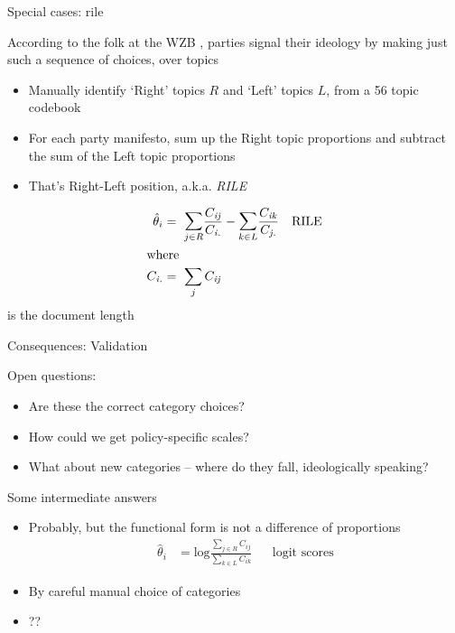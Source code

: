 \documentclass{hertieteaching}
\begin{document}
\begin{frame}{Special cases: rile}

According to the folk at the WZB \parencite{Budge.etal1987,Budge1999}, parties signal their ideology by making just such a sequence of choices, over topics
\begin{itemize}
  \item Manually identify `Right' topics $R$ and `Left' topics $L$, from a 56 topic codebook
  \item For each party manifesto, sum up the Right topic proportions and subtract the sum of the Left topic proportions
  \item That's Right-Left position, a.k.a. \textit{RILE}
\end{itemize}
\begin{align*}
\hat{\theta}_i &=~ \mathlarger{\sum}_{j \in R} \frac{C_\mathit{ij}}{C_\mathit{i.}} -
                 \mathlarger{\sum}_{k \in L} \frac{C_\mathit{ik}}{C_\mathit{j.}}& &\text{RILE}\\
                 \intertext{where}
C_\mathit{i.} &=~ \sum_{j} C_\mathit{ij}                
\end{align*}
is the document length
%
%
%
%

\end{frame}
\begin{frame}{Consequences: Validation}


Open questions:
\begin{itemize}
  \item Are these the correct category choices?
  \item How could we get policy-specific scales? \parencite{Lowe.etal2011,Benoit.etal2012a}
  \item What about new categories -- where do they fall, ideologically speaking?
\end{itemize}

Some intermediate answers \parencite{Lowe.etal2011}
\begin{itemize}
  \item Probably, but the functional form is not a difference of proportions
\begin{align*}
\hat{\theta}_i & = \text{log} \frac{\sum_{j \in R} C_{ij}}
                                   {\sum_{k \in L} C_{ik}} & & \text{logit scores}
\end{align*}
  \item By careful manual choice of categories
  \item ??
\end{itemize}

\end{frame}
\end{document}
